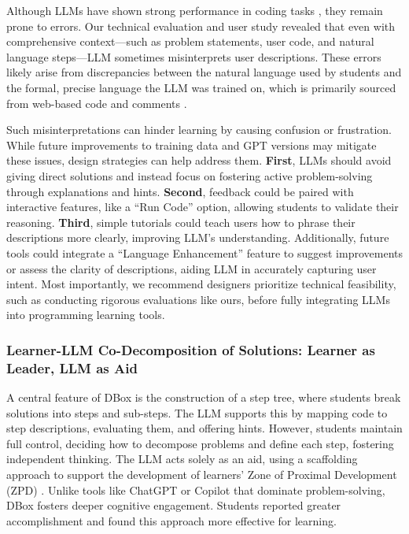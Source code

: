 {Although LLMs have shown strong performance in coding tasks \cite{finnie2023my, leinonen2023using}, they remain prone to errors. Our technical evaluation and user study revealed that even with comprehensive context—such as problem statements, user code, and natural language steps—LLM sometimes misinterprets user descriptions. These errors likely arise from discrepancies between the natural language used by students and the formal, precise language the LLM was trained on, which is primarily sourced from web-based code and comments \cite{liu2023wants}.

Such misinterpretations can hinder learning by causing confusion or frustration. While future improvements to training data and GPT versions may mitigate these issues, design strategies can help address them. \textbf{First}, LLMs should avoid giving direct solutions and instead focus on fostering active problem-solving through explanations and hints. \textbf{Second}, feedback could be paired with interactive features, like a ``Run Code'' option, allowing students to validate their reasoning. \textbf{Third}, simple tutorials could teach users how to phrase their descriptions more clearly, improving LLM's understanding. Additionally, future tools could integrate a ``Language Enhancement'' feature to suggest improvements or assess the clarity of descriptions, aiding LLM in accurately capturing user intent. Most importantly, we recommend designers prioritize technical feasibility, such as conducting rigorous evaluations like ours, before fully integrating LLMs into programming learning tools.
}



\subsubsection{\textbf{Learner-LLM Co-Decomposition of Solutions: Learner as Leader, LLM as Aid}}

A central feature of DBox is the construction of a step tree, where students break solutions into steps and sub-steps. The LLM supports this by mapping code to step descriptions, evaluating them, and offering hints. However, students maintain full control, deciding how to decompose problems and define each step, fostering independent thinking. The LLM acts solely as an aid, using a scaffolding approach to support the development of learners' Zone of Proximal Development (ZPD) \cite{chaiklin2003zone}. Unlike tools like ChatGPT or Copilot that dominate problem-solving, DBox fosters deeper cognitive engagement. Students reported greater accomplishment and found this approach more effective for learning.

